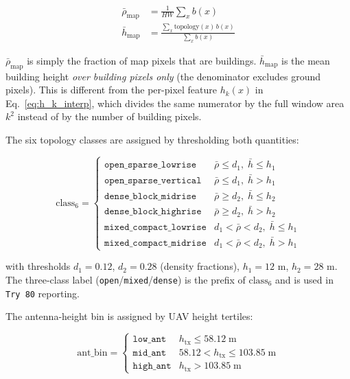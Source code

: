 \documentclass[11pt,a4paper]{article}
\begin{document}
\begin{align}
\bar\rho_{\mathrm{map}}
&= \frac{1}{HW}\sum_{x} b(x)
\label{eq:global_density}\\[4pt]
\bar h_{\mathrm{map}}
&= \frac{\displaystyle\sum_{x} \mathrm{topology}(x)\,b(x)}
        {\displaystyle\sum_{x} b(x)}
\label{eq:global_mean_bldg_height}
\end{align}

$\bar\rho_{\mathrm{map}}$ is simply the fraction of map pixels that are
buildings. $\bar h_{\mathrm{map}}$ is the mean building height
\emph{over building pixels only} (the denominator excludes ground pixels).
This is different from the per-pixel feature $h_k(x)$ in
Eq.~\eqref{eq:h_k_interp}, which divides the same numerator by the full
window area $k^2$ instead of by the number of building pixels.

The six topology classes are assigned by thresholding both quantities:

\begin{equation}
\mathrm{class}_6 =
\begin{cases}
\texttt{open\_sparse\_lowrise}   & \bar\rho \le d_1,\; \bar h \le h_1 \\
\texttt{open\_sparse\_vertical}  & \bar\rho \le d_1,\; \bar h > h_1 \\
\texttt{dense\_block\_midrise}   & \bar\rho \ge d_2,\; \bar h \le h_2 \\
\texttt{dense\_block\_highrise}  & \bar\rho \ge d_2,\; \bar h > h_2 \\
\texttt{mixed\_compact\_lowrise} & d_1 < \bar\rho < d_2,\; \bar h \le h_1 \\
\texttt{mixed\_compact\_midrise} & d_1 < \bar\rho < d_2,\; \bar h > h_1
\end{cases}
\label{eq:topo6}
\end{equation}

with thresholds $d_1 = 0.12$, $d_2 = 0.28$ (density fractions),
$h_1 = 12$ m, $h_2 = 28$ m. The three-class label
(\texttt{open}/\texttt{mixed}/\texttt{dense}) is the prefix of
$\mathrm{class}_6$ and is used in \texttt{Try 80} reporting.

The antenna-height bin is assigned by UAV height tertiles:

\begin{equation}
\mathrm{ant\_bin} =
\begin{cases}
\texttt{low\_ant}  & h_{\mathrm{tx}} \le 58.12\;\mathrm{m} \\
\texttt{mid\_ant}  & 58.12 < h_{\mathrm{tx}} \le 103.85\;\mathrm{m} \\
\texttt{high\_ant} & h_{\mathrm{tx}} > 103.85\;\mathrm{m}
\end{cases}
\label{eq:ant_bin}
\end{equation}
\end{document}
